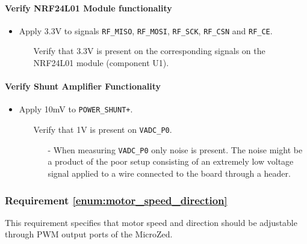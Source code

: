 \paragraph{Verify NRF24L01 Module functionality} %
\label{par:verify_nrf24l01_module_functionality}
\begin{itemize}
	\item Apply 3.3V to signals \texttt{RF\_MISO}, \texttt{RF\_MOSI}, \texttt{RF\_SCK}, \texttt{RF\_CSN} and \texttt{RF\_CE}.
	\begin{itemize}
		\item[\cmark] Verify that 3.3V is present on the corresponding signals on the NRF24L01 module (component U1).
	\end{itemize}
\end{itemize}

\paragraph{Verify Shunt Amplifier Functionality} %
\label{par:verify_shunt_amplifier_functionality}
\begin{itemize}
	\item Apply 10mV to \texttt{POWER\_SHUNT+}.
	\begin{itemize}
		\item[\xmark] Verify that 1V is present on \texttt{VADC\_P0}.
		\begin{itemize}
			\item[-] When measuring \texttt{VADC\_P0} only noise is present. 
			The noise might be a product of the poor setup consisting of an extremely low voltage signal applied to a wire connected to the board through a header. 
		\end{itemize}
	\end{itemize}
\end{itemize}


\subsubsection{Requirement \ref{enum:motor_speed_direction}} %
\label{subs:requirement_enum:motor_speed_direction}
This requirement specifies that motor speed and direction should be adjustable through PWM output ports of the MicroZed.

